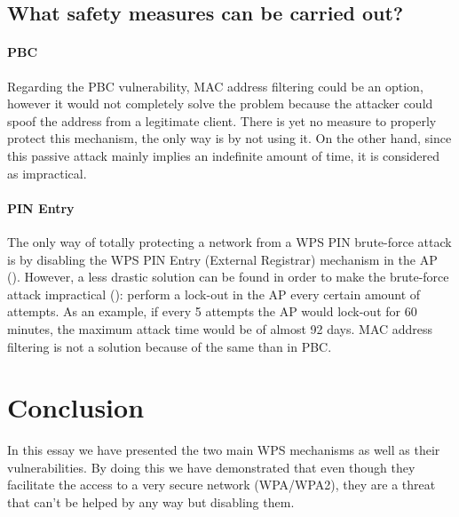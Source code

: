 \documentclass[a4paper,11pt]{article}
\begin{document}
\subsection{What safety measures can be carried out?}
\paragraph{PBC} Regarding the PBC vulnerability, MAC address filtering could be an option, however it would not completely solve the problem because the attacker could spoof the address from a legitimate client. There is yet no measure to properly protect this mechanism, the only way is by not using it. On the other hand, since this passive attack mainly implies an indefinite amount of time, it is considered as impractical.

\paragraph{PIN Entry} The only way of totally protecting a network from a WPS PIN brute-force attack is by disabling the WPS PIN Entry (External Registrar) mechanism in the AP (\cite{cisco,cert}). However, a less drastic solution can be found in order to make the brute-force attack impractical (\cite{stefan}): perform a lock-out in the AP every certain amount of attempts. As an example, if every 5 attempts the AP would lock-out for 60 minutes, the maximum attack time would be of almost 92 days. MAC address filtering is not a solution because of the same than in PBC.

\section{Conclusion}
In this essay we have presented the two main WPS mechanisms as well as their vulnerabilities. By doing this we have demonstrated that even though they facilitate the access to a very secure network (WPA/WPA2), they are a threat that can't be helped by any way but disabling them.
\end{document}
